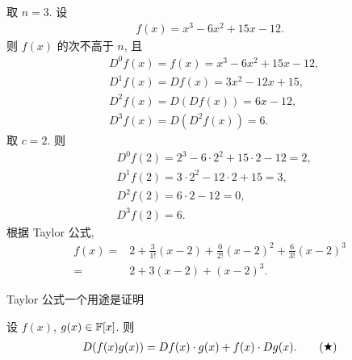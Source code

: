 \begin{example}
    取 $n = 3$. 设
    \begin{align*}
        f(x) = x^3 - 6x^2 + 15x - 12.
    \end{align*}
    则 $f(x)$ 的次不高于 $n$, 且
    \begin{align*}
         & D^0 f(x) = f(x) = x^3 - 6x^2 + 15x - 12, \\
         & D^1 f(x) = D f(x) = 3x^2 - 12x + 15,     \\
         & D^2 f(x) = D (D f(x)) = 6x - 12,         \\
         & D^3 f(x) = D (D^2 f(x)) = 6.
    \end{align*}
    取 $c = 2$. 则
    \begin{align*}
         & D^0 f(2) = 2^3 - 6 \cdot 2^2 + 15 \cdot 2 - 12 = 2, \\
         & D^1 f(2) = 3 \cdot 2^2 - 12 \cdot 2 + 15 = 3,       \\
         & D^2 f(2) = 6 \cdot 2 - 12 = 0,                      \\
         & D^3 f(2) = 6.
    \end{align*}
    根据 Taylor 公式,
    \begin{align*}
        f(x)
        = {} & 2 + \frac{3}{1!} (x-2) + \frac{0}{2!} (x-2)^2 + \frac{6}{3!} (x-2)^3 \\
        = {} & 2 + 3(x-2) + (x-2)^3.
    \end{align*}
\end{example}

Taylor 公式一个用途是证明

\begin{proposition}
    设 $f(x)$, $g(x) \in \mathbb{F}[x]$. 则
    \begin{align*}
        D(f(x) g(x)) = Df(x) \cdot g(x) + f(x) \cdot Dg(x). \tag*{(\ding{72})}
    \end{align*}
\end{proposition}

